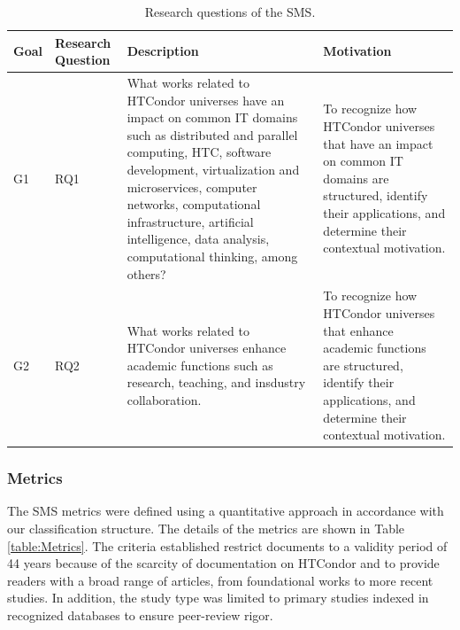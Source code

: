 \begin{table}[htbp]
	\centering
	\caption{Research questions of the SMS.}
	\label{table:RQs}
	\renewcommand{\arraystretch}{1}  %
	\begin{tabular}{p{1cm}p{1.7cm}p{6.8cm}p{6.8cm}}
		\toprule
		\textbf{Goal} & \textbf{Research Question} & \textbf{Description}                                                                                                                                                                                                                                                                                                 & \textbf{Motivation}                                                                                                                                                  \\
		\midrule
		G1            & RQ1                        & What works related to HTCondor universes have an impact on common IT domains such as distributed and parallel computing, HTC, software development, virtualization and microservices, computer networks, computational infrastructure, artificial intelligence, data analysis, computational thinking, among others? & To recognize how HTCondor universes that have an impact on common IT domains are structured, identify their applications, and determine their contextual motivation. \\
		\addlinespace[0.8em]
		G2            & RQ2                        & What works related to HTCondor universes enhance academic functions such as research, teaching, and insdustry collaboration.                                                                                                                                                                                         & To recognize how HTCondor universes that enhance academic functions are structured, identify their applications, and determine their contextual motivation.          \\
		\bottomrule
	\end{tabular}
\end{table}

\subsubsection{Metrics}
The SMS metrics were defined using a quantitative approach in accordance with our classification structure. The details of the metrics are shown in Table \ref{table:Metrics}. The criteria established restrict documents to a validity period of 44 years because of the scarcity of documentation on HTCondor and to provide readers with a broad range of articles, from foundational works to more recent studies. In addition, the study type was limited to primary studies indexed in recognized databases to ensure peer-review rigor.

